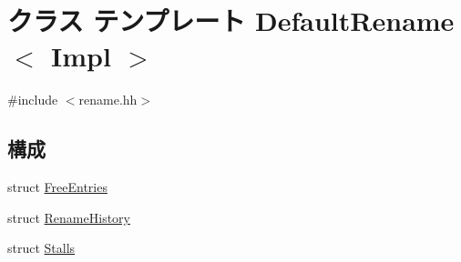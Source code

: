 \hypertarget{classDefaultRename}{
\section{クラス テンプレート DefaultRename$<$ Impl $>$}
\label{classDefaultRename}
}


{\ttfamily \#include $<$rename.hh$>$}\subsection*{構成}
\begin{DoxyCompactItemize}
\item 
struct \hyperlink{structDefaultRename_1_1FreeEntries}{FreeEntries}
\item 
struct \hyperlink{structDefaultRename_1_1RenameHistory}{RenameHistory}
\item 
struct \hyperlink{structDefaultRename_1_1Stalls}{Stalls}
\end{DoxyCompactItemize}
